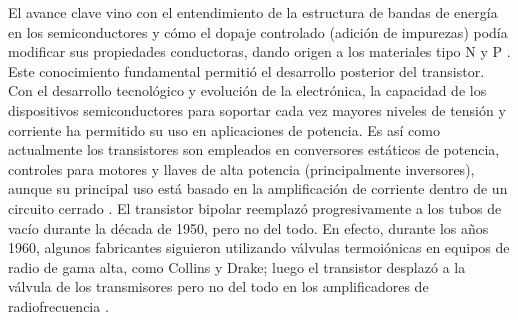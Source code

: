 \documentclass[]{article}
\begin{document}
El avance clave vino con el entendimiento de la estructura de bandas de energía en los semiconductores y cómo el dopaje controlado (adición de impurezas) podía modificar sus propiedades conductoras, dando origen a los materiales tipo N y P \cite{braunmacdonald}. Este conocimiento fundamental permitió el desarrollo posterior del transistor.
Con el desarrollo tecnológico y evolución de la electrónica, la capacidad de los dispositivos semiconductores para soportar cada vez mayores niveles de tensión y corriente ha permitido su uso en aplicaciones de potencia. Es así como actualmente los transistores son empleados en conversores estáticos de potencia, controles para motores y llaves de alta potencia (principalmente inversores), aunque su principal uso está basado en la amplificación de corriente dentro de un circuito cerrado \cite{belllabs}.
El transistor bipolar reemplazó progresivamente a los tubos de vacío durante la década de 1950, pero no del todo. En efecto, durante los años 1960, algunos fabricantes siguieron utilizando válvulas termoiónicas en equipos de radio de gama alta, como Collins y Drake; luego el transistor desplazó a la válvula de los transmisores pero no del todo en los amplificadores de radiofrecuencia \cite{braunmacdonald}.
\end{document}
